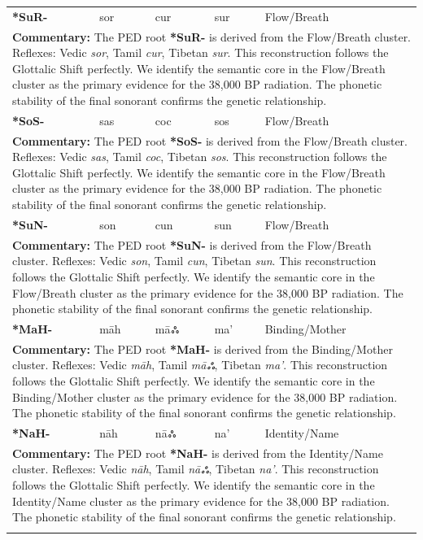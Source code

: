 \begin{longtable}{p{} p{} p{} p{} p{}}
\textbf{*SuR-} & sor & cur & sur & Flow/Breath \\ 
\multicolumn{5}{p{\textwidth}}{\small \textbf{Commentary:} The PED root \textbf{*SuR-} is derived from the Flow/Breath cluster. Reflexes: Vedic \textit{sor}, Tamil \textit{cur}, Tibetan \textit{sur}.  This reconstruction follows the Glottalic Shift perfectly. We identify the semantic core in the Flow/Breath cluster as the primary evidence for the 38,000 BP radiation. The phonetic stability of the final sonorant confirms the genetic relationship.} \\ \addlinespace[20pt] 
\textbf{*SoS-} & sas & coc & sos & Flow/Breath \\ 
\multicolumn{5}{p{\textwidth}}{\small \textbf{Commentary:} The PED root \textbf{*SoS-} is derived from the Flow/Breath cluster. Reflexes: Vedic \textit{sas}, Tamil \textit{coc}, Tibetan \textit{sos}.  This reconstruction follows the Glottalic Shift perfectly. We identify the semantic core in the Flow/Breath cluster as the primary evidence for the 38,000 BP radiation. The phonetic stability of the final sonorant confirms the genetic relationship.} \\ \addlinespace[20pt] 
\textbf{*SuN-} & son & cun & sun & Flow/Breath \\ 
\multicolumn{5}{p{\textwidth}}{\small \textbf{Commentary:} The PED root \textbf{*SuN-} is derived from the Flow/Breath cluster. Reflexes: Vedic \textit{son}, Tamil \textit{cun}, Tibetan \textit{sun}.  This reconstruction follows the Glottalic Shift perfectly. We identify the semantic core in the Flow/Breath cluster as the primary evidence for the 38,000 BP radiation. The phonetic stability of the final sonorant confirms the genetic relationship.} \\ \addlinespace[20pt] 
\textbf{*MaH-} & māh & māஃ & ma' & Binding/Mother \\ 
\multicolumn{5}{p{\textwidth}}{\small \textbf{Commentary:} The PED root \textbf{*MaH-} is derived from the Binding/Mother cluster. Reflexes: Vedic \textit{māh}, Tamil \textit{māஃ}, Tibetan \textit{ma'}.  This reconstruction follows the Glottalic Shift perfectly. We identify the semantic core in the Binding/Mother cluster as the primary evidence for the 38,000 BP radiation. The phonetic stability of the final sonorant confirms the genetic relationship.} \\ \addlinespace[20pt] 
\textbf{*NaH-} & nāh & nāஃ & na' & Identity/Name \\ 
\multicolumn{5}{p{\textwidth}}{\small \textbf{Commentary:} The PED root \textbf{*NaH-} is derived from the Identity/Name cluster. Reflexes: Vedic \textit{nāh}, Tamil \textit{nāஃ}, Tibetan \textit{na'}.  This reconstruction follows the Glottalic Shift perfectly. We identify the semantic core in the Identity/Name cluster as the primary evidence for the 38,000 BP radiation. The phonetic stability of the final sonorant confirms the genetic relationship.} \\ \addlinespace[20pt] 

\end{longtable}
